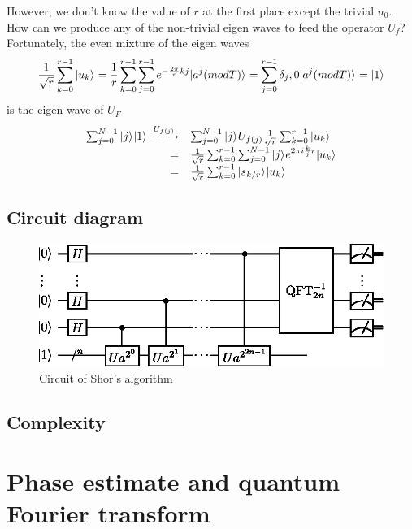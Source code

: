 \documentclass{ctexbook}
\begin{document}
However, we don't know the value of $r$ at the first place except the trivial $u_0$. How can we produce any of the non-trivial eigen waves to feed the operator $U_f$? Fortunately, the even mixture of the eigen waves
\begin{equation}\label{sum_u}
    \frac 1 {\sqrt{r}} \sum^{r-1}_{k=0}\vert {u_k} \rangle_{} = \frac 1 r \sum^{r-1}_{k=0} \sum^{r-1}_{j=0} e^{-{\frac {2\pi} r} kj} \vert {a^j (mod T)} \rangle_{} = \sum^{r-1}_{j=0} \delta_j,0 \vert {a^j (mod T)} \rangle_{} = \vert {1} \rangle_{}
\end{equation}
is the eigen-wave of $U_F$
\begin{equation}\label{ctrl_u}
\begin{array}{rl}
 \sum^{N-1}_{j=0} \vert {j} \rangle_{} \vert {1} \rangle_{} \xrightarrow{U_{f(j)}} & \sum^{N-1}_{j=0} \vert {j} \rangle_{} U_{f(j)} \frac 1 {\sqrt{r}} \sum^{r-1}_{k=0}\vert {u_k} \rangle_{}\\
    = & \frac 1 {\sqrt{r}} \sum^{r-1}_{k=0} \sum^{N-1}_{j=0} \vert {j} \rangle_{} e^{2\pi i \frac kj r} \vert {u_k} \rangle_{}\\
    = & \frac 1 {\sqrt{r}} \sum^{r-1}_{k=0} \vert {s_{k/r}} \rangle_{} \vert {u_k} \rangle_{}
\end{array}
\end{equation}

\subsection{Circuit diagram}
\begin{figure}[h]
\includegraphics[width=12cm]{pic/Shor_algorithm.eps}
\caption{Circuit of Shor's algorithm}
\label{ShorAlgorithm}
\end{figure}

\subsection{Complexity}

\section{Phase estimate and quantum Fourier transform}
\end{document}
